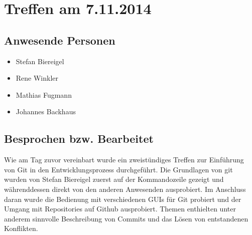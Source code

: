 \chapter{Treffen am 7.11.2014}
\section{Anwesende Personen}
\begin{itemize}
	\item Stefan Biereigel
	\item Rene Winkler
	\item Mathias Fugmann
	\item Johannes Backhaus
\end{itemize}

\section{Besprochen bzw. Bearbeitet}
Wie am Tag zuvor vereinbart wurde ein zweistündiges Treffen zur Einführung von Git in den Entwicklungsprozess durchgeführt. Die Grundlagen von git wurden von Stefan Biereigel zuerst auf der Kommandozeile gezeigt und währenddessen direkt von den anderen Anwesenden ausprobiert. Im Anschluss daran wurde die Bedienung mit verschiedenen GUIs für Git probiert und der Umgang mit Repositories auf Github ausprobiert. Themen enthielten unter anderem sinnvolle Beschreibung von Commits und das Lösen von entstandenen Konflikten.